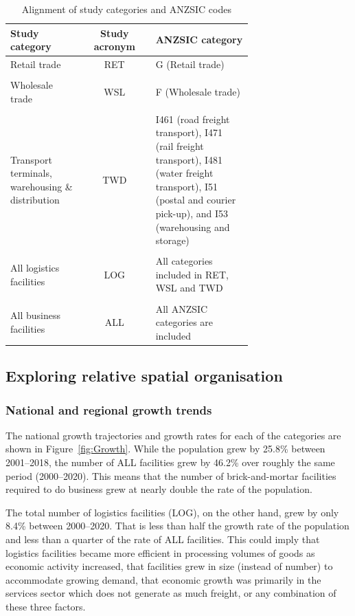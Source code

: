 \documentclass[3p, a4paper, authoryear, 11pt, fleqn, review]{elsarticle}
\newcommand{\nmt}[1]{{\color{ForestGreen}{~(nmt: #1)}}}
\begin{document}
\begin{table}[!h]
\caption{Alignment of study categories and ANZSIC codes}\label{tab:Codes}
\begin{tabular}{L{0.3\linewidth} c L{0.4\linewidth}}
\toprule
Study category & Study acronym & ANZSIC category\\
\midrule
Retail trade & RET & G (Retail trade)\\
\\
Wholesale trade & WSL & F (Wholesale trade)\\
\\
Transport terminals, warehousing \& distribution & TWD & I461 (road freight transport), I471 (rail freight transport), I481 (water freight transport), I51 (postal and courier pick-up), and I53 (warehousing and storage)\\ \\
All logistics facilities & LOG & All categories included in RET, WSL and TWD\\ \\
All business facilities & ALL & All ANZSIC categories are included\\
\bottomrule
\end{tabular}
\end{table}

\subsection{Exploring relative spatial organisation}
\nmt{Some intro}

\subsubsection{National and regional growth trends}
The national growth trajectories and growth rates for each of the categories are shown in Figure~\ref{fig:Growth}. While the population grew by 25.8\% between 2001--2018, the number of ALL facilities grew by 46.2\% over roughly the same period (2000--2020). This means that the number of brick-and-mortar facilities required to do business grew at nearly double the rate of the population. \nmt{Insert comparison with economic growth when I have that timeseries.}

The total number of logistics facilities (LOG), on the other hand, grew by only 8.4\% between 2000--2020. That is less than half the growth rate of the population and less than a quarter of the rate of ALL facilities. This could imply that logistics facilities became more efficient in processing volumes of goods as economic activity increased, that facilities grew in size (instead of number) to accommodate growing demand, that economic growth was primarily in the services sector which does not generate as much freight, or any combination of these three factors. \nmt{Could go back to NZ.Stat when it's back online to look at income per sector}
\end{document}
